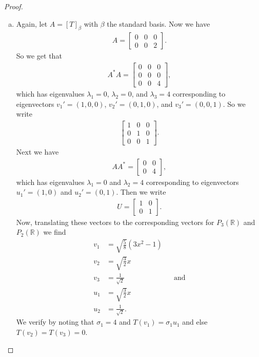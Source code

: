 \documentclass[leqno]{article}
\theoremstyle{nonumberplain}
\newtheorem{proof}{Proof}
\newcommand{\R}{\mathbb{R}}
\begin{document}
\begin{proof}
\begin{enumerate}[(a)]
\item Again, let $A=[T]_\beta$ with $\beta$ the standard basis.  Now we have
\begin{align*}
A=\begin{bmatrix}
0 & 0 & 0\\
0 & 0 & 2
\end{bmatrix}.
\end{align*}
So we get that
\begin{align*}
A^*A=
\begin{bmatrix}
0 & 0 & 0\\
0 & 0 & 0\\
0 & 0 & 4
\end{bmatrix},
\end{align*}
which has eigenvalues $\lambda_1=0$, $\lambda_2=0$, and $\lambda_3=4$ corresponding to eigenvectors $v_1'=(1,0,0)$, $v_2'=(0,1,0)$, and $v_3'=(0,0,1)$. So we write
\begin{align*}
\begin{bmatrix}
1 & 0 & 0\\
0 & 1 & 0\\
0 & 0 & 1
\end{bmatrix}. 
\end{align*}
Next we have
\begin{align*}
AA^*=
\begin{bmatrix}
0 & 0\\
0 & 4
\end{bmatrix},
\end{align*}
which has eigenvalues $\lambda_1=0$ and $\lambda_2=4$ corresponding to eigenvectors $u_1'=(1,0)$ and $u_2'=(0,1)$. Then we write
\begin{align*}
U=
\begin{bmatrix}
1 & 0\\
0 & 1
\end{bmatrix}.
\end{align*}
Now, translating these vectors to the corresponding vectors for $P_3(\R)$ and $P_2(\R)$ we find
\begin{align*}
v_1&=\sqrt{\frac{5}{8}}(3x^2-1)\\
v_2&=\sqrt{\frac{3}{2}}x\\
v_3&=\frac{1}{\sqrt{2}} &&\textrm{and}\\
u_1&=\sqrt{\frac{3}{2}}x\\
u_2&=\frac{1}{\sqrt{2}}.
\end{align*}
We verify by noting that $\sigma_1=4$ and $T(v_1)=\sigma_1 u_1$ and else $T(v_2)=T(v_3)=0$.
\end{enumerate}

\end{proof}
\end{document}

